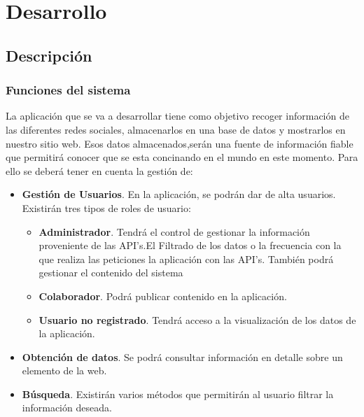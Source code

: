 
\chapter{Desarrollo}

\section{Descripción}

\subsection{Funciones del sistema}

La aplicación que se va a desarrollar tiene como objetivo recoger información de las diferentes redes sociales, almacenarlos en una base de datos y
mostrarlos en nuestro sitio web. Esos datos almacenados,serán una fuente de información fiable que permitirá conocer que se esta concinando en el mundo
en este momento. Para ello se deberá tener en cuenta la gestión de:

\begin{itemize}

\item \textbf{Gestión de Usuarios}. En la aplicación, se podrán dar de alta usuarios. Existirán tres tipos de roles de usuario:

\begin{itemize}
\item \textbf{Administrador}. Tendrá el control de gestionar la información proveniente de las API's.El Filtrado de los datos o la frecuencia con la que realiza las peticiones la aplicación con las API's.
También podrá gestionar el contenido del sistema
\item \textbf{Colaborador}. Podrá publicar contenido en la aplicación.
\item \textbf{Usuario no registrado}. Tendrá acceso a la visualización de los datos de la aplicación.
\end{itemize}

\item \textbf{Obtención de datos}. Se podrá consultar información en detalle sobre un elemento de la web.

\item \textbf{Búsqueda}. Existirán varios métodos que permitirán al usuario filtrar la información deseada.

\end{itemize}

